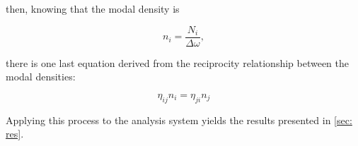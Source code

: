 then, knowing that the modal density is 

\begin{equation}
n_i = \frac{N_i}{\Delta \omega},
\end{equation}

there is one last equation derived from the reciprocity relationship between the modal densities:


\begin{equation}
\eta_{ij} n_i = \eta_{ji} n_j
\label{eq: reciproc}
\end{equation}

Applying this process to the analysis system yields the results presented in \autoref{sec: res}.




